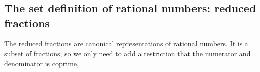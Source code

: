 \begin{code}
\\
\>\AgdaFunction{\_*\_} \AgdaSymbol{:}     \<%
\\
\>\AgdaSymbol{(}\AgdaInductiveConstructor{+} \AgdaSymbol{)} \AgdaFunction{*}  \AgdaSymbol{=} \AgdaInductiveConstructor{+} \AgdaSymbol{(}  \AgdaSymbol{)}\<%
\\
\>\AgdaSymbol{(} \AgdaSymbol{)} \AgdaFunction{*}  \AgdaSymbol{=} \AgdaInductiveConstructor{+} \<%
\\
\>\AgdaSymbol{(} \AgdaSymbol{)} \AgdaFunction{*}   \AgdaSymbol{=}  \AgdaSymbol{(}     \AgdaSymbol{)}\<%
\\
%
\\
\> \<[35]%
\>[35]\AgdaSymbol{:}   \AgdaSymbol{\_}\<%
\\
\>\AgdaSymbol{(}  \AgdaSymbol{)}  \AgdaSymbol{(}  \AgdaSymbol{)} \AgdaSymbol{=} \<[31]%
\>[31] \AgdaFunction{*}     \AgdaFunction{*}  \<%
\\
\end{code}


\subsection{The set definition of rational numbers: reduced fractions}

The reduced fractions are canonical representations of rational
numbers. It is a subset of fractions, so we only need to add a
restriction that the numerator and denominator is coprime,


